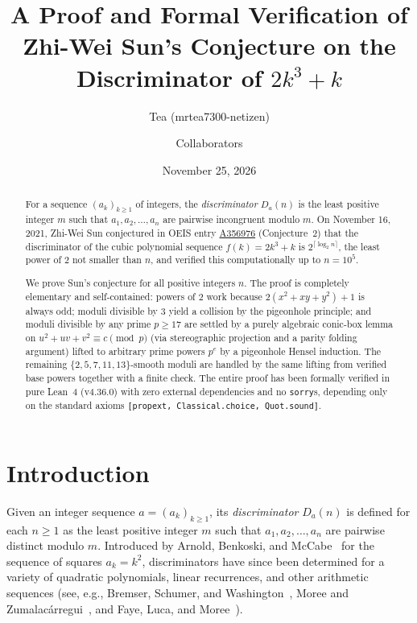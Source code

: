 \documentclass[11pt,reqno]{amsart}
\title[The Discriminator of $2k^3 + k$]{A Proof and Formal Verification of Zhi-Wei Sun's Conjecture on the Discriminator of $2k^3 + k$}
\author{Tea (mrtea7300-netizen) \and Collaborators}
\date{November 25, 2026}
\theoremstyle{remark}
\begin{document}
\begin{abstract}
For a sequence $(a_k)_{k \ge 1}$ of integers, the \emph{discriminator} $D_a(n)$ is the least positive integer $m$ such that $a_1, a_2, \dots, a_n$ are pairwise incongruent modulo $m$. On November 16, 2021, Zhi-Wei Sun conjectured in OEIS entry \href{https://oeis.org/A356976}{A356976} (Conjecture~2) that the discriminator of the cubic polynomial sequence $f(k) = 2k^3 + k$ is $2^{\lceil \log_2 n \rceil}$, the least power of $2$ not smaller than $n$, and verified this computationally up to $n = 10^5$.

We prove Sun's conjecture for all positive integers $n$. The proof is completely elementary and self-contained: powers of $2$ work because $2(x^2 + xy + y^2) + 1$ is always odd; moduli divisible by $3$ yield a collision by the pigeonhole principle; and moduli divisible by any prime $p \ge 17$ are settled by a purely algebraic conic-box lemma on $u^2 + uv + v^2 \equiv c \pmod p$ (via stereographic projection and a parity folding argument) lifted to arbitrary prime powers $p^e$ by a pigeonhole Hensel induction. The remaining $\{2,5,7,11,13\}$-smooth moduli are handled by the same lifting from verified base powers together with a finite check. The entire proof has been formally verified in pure Lean~4 (v4.36.0) with zero external dependencies and no \texttt{sorry}s, depending only on the standard axioms \texttt{[propext, Classical.choice, Quot.sound]}.
\end{abstract}

\maketitle

\section{Introduction}

Given an integer sequence $a = (a_k)_{k \ge 1}$, its \emph{discriminator} $D_a(n)$ is defined for each $n \ge 1$ as the least positive integer $m$ such that $a_1, a_2, \dots, a_n$ are pairwise distinct modulo $m$. Introduced by Arnold, Benkoski, and McCabe~\cite{ABM1985} for the sequence of squares $a_k = k^2$, discriminators have since been determined for a variety of quadratic polynomials, linear recurrences, and other arithmetic sequences (see, e.g., Bremser, Schumer, and Washington~\cite{BSW1990}, Moree and Zumalac\'arregui~\cite{MZ2016}, and Faye, Luca, and Moree~\cite{FLM2019}).
\end{document}
